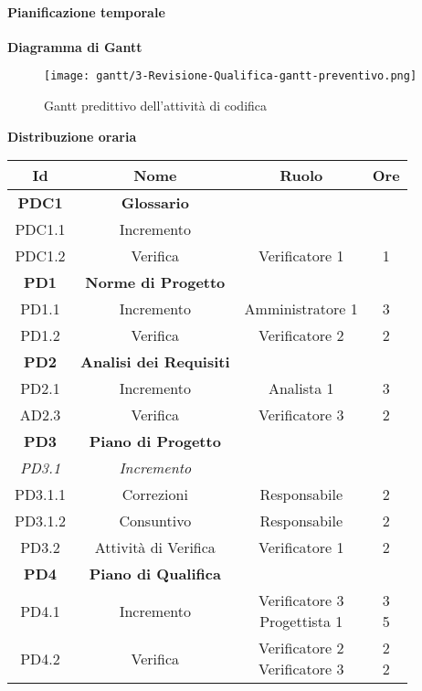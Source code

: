 \documentclass{scalatekids-article}
\begin{document}
\newpage
\paragraph{Pianificazione temporale}
\textbf{Diagramma di Gantt}
\begin{figure}[H]
  \texttt{[image: gantt/3-Revisione-Qualifica-gantt-preventivo.png]}
  \caption{Gantt predittivo dell'attività di codifica}
\end{figure}

\newpage
\textbf{Distribuzione oraria}
\scriptsize
\begin{center}
  \begin{tabular}{| c | c | c | c |}
    \hline
    \textbf{Id} & \textbf{Nome} & \textbf{Ruolo} & \textbf{Ore}\\
    \hline
    \textbf{PDC1} & \textbf{Glossario} & &\\
    \hline
    PDC1.1 & Incremento &  &\\
    \hline
    PDC1.2 & Verifica & Verificatore 1 & 1\\
    \hline
    \textbf{PD1} & \textbf{Norme di Progetto} & &\\
    \hline
    PD1.1 & Incremento & Amministratore 1 & 3\\
    \hline
    PD1.2 & Verifica & Verificatore 2 & 2\\
    \hline
    \textbf{PD2} & \textbf{Analisi dei Requisiti} & &\\
    \hline
    PD2.1 & Incremento & Analista 1 & 3\\
    \hline
    AD2.3 & Verifica & Verificatore 3 & 2\\
    \hline
    \textbf{PD3} & \textbf{Piano di Progetto} & &\\
    \hline
    \textit{PD3.1} & \textit{Incremento} & &\\
    \hline
    PD3.1.1 & Correzioni & Responsabile & 2\\
    \hline
    PD3.1.2 & Consuntivo & Responsabile & 2\\
    \hline
    PD3.2 & Attività di Verifica & Verificatore 1 & 2\\
    \hline
    \textbf{PD4} & \textbf{Piano di Qualifica} & &\\
    \hline
    PD4.1 & Incremento & \multiLineCell[t]{Verificatore 3\\Progettista 1} & \multiLineCell[t]{3\\5}\\
    \hline
    PD4.2 & Verifica & \multiLineCell[t]{Verificatore 2\\Verificatore 3} & \multiLineCell[t]{2\\2}\\

\end{tabular}
\end{center}
\end{document}

